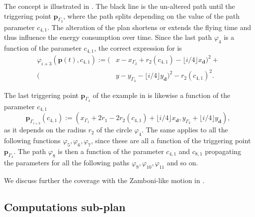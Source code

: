 The concept is illustrated in . The black line is the un-altered path until the triggering point $\mathbf{p}_{\Gamma_3}$, where the path splits depending on the value of the path parameter $c_{4,1}$. The alteration of the plan shortens or extends the flying time and thus influence the energy consumption over time. Since the last path $\varphi_4$ is a function of the parameter $c_{4,1}$, the correct expression for  is 
\begin{equation}\label{eq:line-gene-param}\begin{split}
  \varphi_{i+3}(\mathbf{p}(t),c_{4,1}):=(&x-x_{\Gamma_2}+r_2(c_{4,1})-\lfloor i/4\rfloor x_\mathbf{d})^2+\\
  (&y-y_{\Gamma_3}-\lfloor i/4\rfloor y_\mathbf{d})^2-r_2(c_{4,1})^2.
\end{split}\end{equation}

The last triggering point $\mathbf{p}_{\Gamma_4}$ of the example in  is likewise a function of the parameter $c_{4,1}$
\begin{equation}
  \mathbf{p}_{\Gamma_{i+3}}(c_{4,1}):=(x_{\Gamma_1}+2r_1-2r_2(c_{4,1})+\lfloor i/4\rfloor x_\mathbf{d},y_{\Gamma_3}+\lfloor i/4\rfloor y_\mathbf{d}),
\end{equation}
as it depends on the radius $r_2$ of the circle $\varphi_4$. The same applies to all the following functions $\varphi_5,\varphi_6,\varphi_7$, since these are all a function of the triggering point $\mathbf{p}_{\Gamma_4}$. The path $\varphi_8$ is then a function of the parameter $c_{4,1}$ and $c_{8,1}$ propagating the parameters for all the following paths $\varphi_9,\varphi_{10},\varphi_{11}$ and so on.

We discuss further the coverage with the Zamboni-like motion in .

\subsection{Computations sub-plan}
\label{sec:computation-wise}

